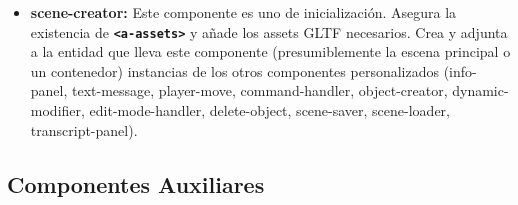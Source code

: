 \documentclass[a4paper, 12pt]{book}
\begin{document}
\begin{itemize}
Cuando se recibe uno de estos eventos, el componente cambia dinámicamente el color del material del propio elemento al que está asociado (con un 'setAttribute'); en el caso del Listado~\ref{lst:skyManager} el objeto que cambiará de color será el panel. 
\begin{lstlisting}[language=HTML, caption=Escena de uso para cambio de color en el componente sky-managar, captionpos=b, label=lst:skyManager]
  <a-plane sky-manager></a-plane>
\end{lstlisting}
De este modo, cada modo activo (crear, editar, ayuda, eliminar, etc.) puede reflejarse visualmente mediante un color distinto, facilitando la comprensión del estado actual de la interfaz.
  \item \textbf{scene-creator:}
Este componente es uno de inicialización. Asegura la existencia de \texttt{\textbf{<a-assets>}} y añade los assets GLTF necesarios.
Crea y adjunta a la entidad que lleva este componente (presumiblemente la escena principal o un contenedor) instancias de los otros componentes personalizados (info-panel, text-message, player-move, command-handler, object-creator, dynamic-modifier, edit-mode-handler, delete-object, scene-saver, scene-loader, transcript-panel).
\end{itemize}
\subsection{Componentes Auxiliares}
\end{document}
